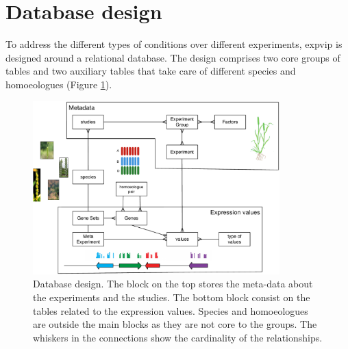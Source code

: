 \section{Database design} 
\label{exp:DB}

To address the different types of conditions over different experiments, \gls{expvip} is designed around a relational database. 
The design comprises two core groups of tables and two auxiliary tables that take care of different species and homoeologues (Figure \ref{fig:expvip:dbDesign}).


\begin{figure}
\centering
\includegraphics[width=0.85\textwidth]{expVIP/Figures/dbDesign.pdf}
\caption[expVIP database design]{Database design. The block on the top stores the meta-data about the experiments and the studies. The bottom block consist on the tables related to the expression values. Species and homoeologues are outside the main blocks as they are not core to the groups. The whiskers in the connections show the cardinality of the relationships.}
\label{fig:expvip:dbDesign}
\end{figure}

